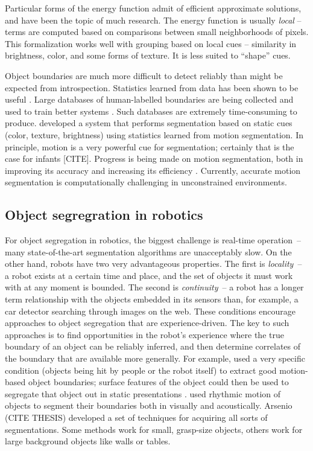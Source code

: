 Particular forms of the energy function admit of efficient 
approximate solutions, and have been the topic of much research.
%
The energy function is usually {\em local} -- terms are computed 
based on comparisons between small neighborhoods of pixels.
%
This formalization works well with grouping based on local
cues -- similarity in brightness, color, and some forms of texture.
It is less suited to ``shape'' cues.


Object boundaries are much more difficult to detect reliably than might be 
expected from introspection.
Statistics learned from data has been shown to be useful
\cite{konishi03statistical}.  Large databases of 
human-labelled boundaries are being collected and
used to train better systems
\cite{martin04learning}.
%
Such databases are extremely time-consuming to produce.
%
 developed a system that performs
segmentation based on static cues (color, texture, brightness)
using statistics learned from motion segmentation.
In principle, motion is a very powerful cue for
segmentation; certainly that is the case for infants
[CITE].
%
Progress is being made on motion segmentation, both 
in improving its accuracy and increasing its efficiency
 \cite{cremers05motion,fowlkes04spectral,smith03motion,smith04layered}.
%
Currently, accurate motion segmentation is 
computationally challenging in unconstrained environments.


\subsection{Object segregration in robotics}

For object segregation in robotics, the biggest challenge is real-time
operation~-- many state-of-the-art segmentation algorithms are
unacceptably slow.  On the other hand, robots have two very
advantageous properties.  
%
The first is
{\em locality}~-- a robot exists at a certain time and place, and the
set of objects it must work with at any moment is bounded.  
%
The second is
{\em continuity}~-- a robot has a longer term relationship with
the objects embedded in its sensors than, for example, a car 
detector searching through images on the web.
%
These conditions encourage approaches to object segregation
that are experience-driven.
%
The key to such approaches is to find
opportunities in the robot's experience where the
true boundary of an object can be reliably inferred,
and then determine correlates of the boundary that 
are available more generally.
%
For example,  used
a very specific condition (objects being hit by
people or the robot itself) to extract good
motion-based object boundaries; surface features
of the object could then be used to segregate that
object out in static presentations \cite{fitzpatrick03object}.
 used rhythmic motion
of objects to segment their boundaries both in
visually and acoustically.
%
Arsenio (CITE THESIS) developed a set of techniques for acquiring all
sorts of segmentations.  Some methods work for small, grasp-size
objects, others work for large background objects like walls or
tables.





